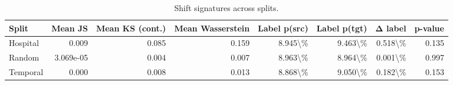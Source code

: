 \begin{table}
\caption{Shift signatures across splits.}
\label{tab:shift-signature}
\begin{tabular}{lrrrrrrr}
\toprule
Split & Mean JS & Mean KS (cont.) & Mean Wasserstein & Label p(src) & Label p(tgt) & Δ label & p-value \\
\midrule
Hospital & 0.009 & 0.085 & 0.159 & 8.945\textbackslash \% & 9.463\textbackslash \% & 0.518\textbackslash \% & 0.135 \\
Random & 3.069e-05 & 0.004 & 0.007 & 8.963\textbackslash \% & 8.964\textbackslash \% & 0.001\textbackslash \% & 0.997 \\
Temporal & 0.000 & 0.008 & 0.013 & 8.868\textbackslash \% & 9.050\textbackslash \% & 0.182\textbackslash \% & 0.153 \\
\bottomrule
\end{tabular}
\end{table}
